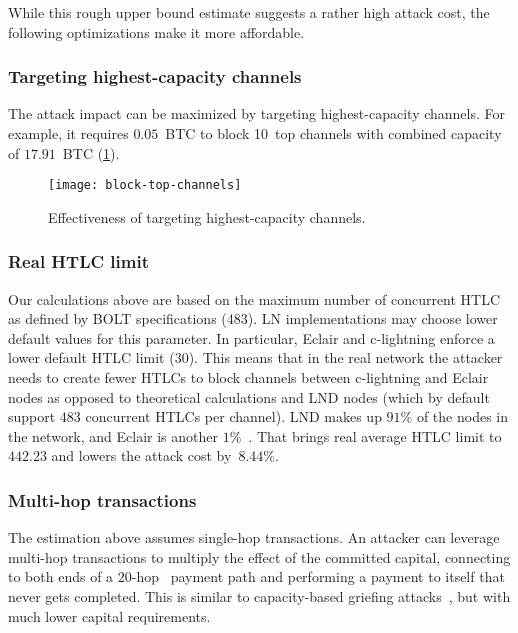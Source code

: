 While this rough upper bound estimate suggests a rather high attack cost, the following optimizations make it more affordable.


\subsubsection*{Targeting highest-capacity channels}
The attack impact can be maximized by targeting highest-capacity channels.
For example, it requires $0.05$~BTC to block 10~top channels with combined capacity of $17.91$~BTC (\cref{fig:block-top-channels}).

\begin{figure}[tb]
	\centering
	\texttt{[image: block-top-channels]}
	\caption{Effectiveness of targeting highest-capacity channels.\label{fig:block-top-channels}}
\end{figure}

\subsubsection*{Real HTLC limit}
Our calculations above are based on the maximum number of concurrent HTLC as defined by BOLT specifications ($483$).
LN implementations may choose lower default values for this parameter.
In particular, Eclair and c-lightning enforce a lower default HTLC limit ($30$).
This means that in the real network the attacker needs to create fewer HTLCs to block channels between c-lightning and Eclair nodes as opposed to theoretical calculations and LND nodes (which by default support $483$ concurrent HTLCs per channel).
LND makes up $91\%$ of the nodes in the network, and Eclair is another $1\%$~\cite{Mizrahi2020}.
That brings real average HTLC limit to $442.23$ and lowers the attack cost by~$8.44\%$.

\subsubsection*{Multi-hop transactions}
The estimation above assumes single-hop transactions.
An attacker can leverage multi-hop transactions to multiply the effect of the committed capital,
connecting to both ends of a $20$-hop~\cite{Bolt4OnionRouting} payment path and performing a payment 
to itself that never gets completed. 
This is similar to capacity-based griefing attacks~\cite{HerreraJoancomarti2019}, 
but with much lower capital requirements.

